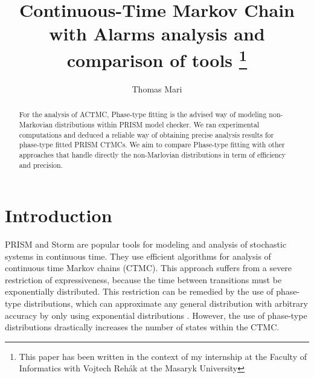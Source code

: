 \documentclass[runningheads,custombib]{llncs}
\begin{document}
%
\title{Continuous-Time Markov Chain with Alarms analysis and comparison of tools \thanks{This paper has been written in the context of my internship at the Faculty of Informatics with Vojtech Reh{\'{a}}k at the Masaryk University}}
%
%
\author{Thomas Mari}%
%
%
%
\maketitle              %
%
\begin{abstract}
For the analysis of ACTMC, Phase-type fitting is the advised way of modeling non-Markovian distributions within PRISM model checker. We ran experimental computations and deduced a reliable way of obtaining precise analysis results for phase-type fitted PRISM CTMCs.
We aim to compare Phase-type fitting with other approaches that handle directly the non-Marlovian distributions in term of efficiency and precision.


\end{abstract}
%
%
%
\section{Introduction}

	PRISM \cite{KNP11} and Storm \cite{DBLP:journals/corr/DehnertJK017} are popular tools for modeling and analysis of stochastic systems in continuous time. They use efficient algorithms for analysis of continuous time Markov chains (CTMC). This approach suffers from a severe restriction of expressiveness, because the time between transitions must be exponentially distributed. This restriction can be remedied by the use of phase-type distributions, which can approximate any general distribution with arbitrary accuracy by only using exponential distributions \cite{Buchholz:2014:IMP:2683922}. However, the use of phase-type distributions drastically increases the number of states within the CTMC.
	
\end{document}
